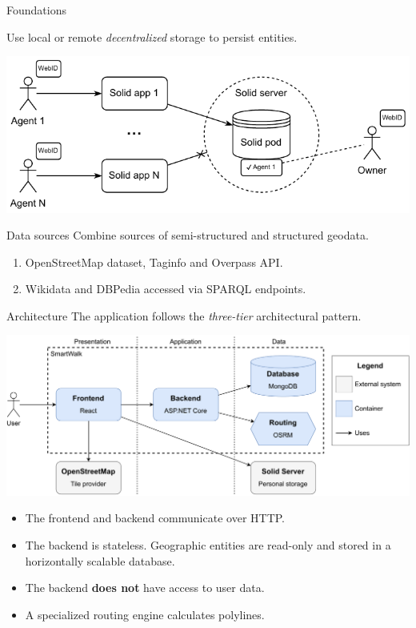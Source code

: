 \documentclass[portrait,a0paper,fontscale=0.25]{baposter}
\begin{document}
\begin{poster}
\begin{posterbox}[column=0, name=foundations, below=motivation, headerColorOne=cyan!60, boxColorOne=cyan!20]{Foundations}
\vspace{0.5em}

Use local or remote \emph{decentralized} storage to persist entities.

\begin{center}
\includegraphics[width=0.62\linewidth]{./img/poster/concept-of-decentralization.pdf}
\end{center}
\end{posterbox}

\begin{posterbox}[column=0, name=data, below=foundations]{Data sources}
Combine sources of semi-structured and structured geodata.

\begin{enumerate}
\item OpenStreetMap dataset, Taginfo and Overpass API.
\item Wikidata and DBPedia accessed via SPARQL endpoints.
\end{enumerate}
\end{posterbox}

\begin{posterbox}[column=0, name=architecture, below=data]{Architecture}
The application follows the \emph{three-tier} architectural pattern.

\begin{center}
\includegraphics[width=0.98\linewidth]{./img/poster/c4-container-diagram.pdf}
\end{center}

\begin{itemize}
\item The frontend and backend communicate over HTTP.
\item The backend is stateless. Geographic entities are read-only and stored in a horizontally scalable database.
\item The backend \textbf{does not} have access to user data.
\item A specialized routing engine calculates polylines.
\end{itemize}


\end{posterbox}
\end{poster}
\end{document}
